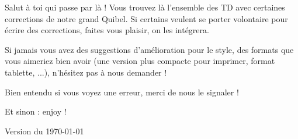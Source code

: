 \documentclass{../commun/prepacours}
\begin{document}
\begin{center}
  \vspace*{2cm}
  
  
  \makeatletter
  \vspace{1.5cm}
  {\Large \@filiere \par}
  \vspace{0.5cm}
  {\large \@etablissement \par}
  \vspace{2cm}
  
  \begin{minipage}{0.8\textwidth}
    \vspace{0.5cm}
    
    Salut à toi qui passe par là ! Vous trouvez là l'ensemble des TD avec certaines corrections de notre grand Quibel. 
    Si certains veulent se porter volontaire pour écrire des corrections, faites 
    vous plaisir, on les intégrera.

    \avspace Si jamais vous avez des suggestions d'amélioration pour le style, 
    des formats que vous aimeriez bien avoir (une version plus compacte pour 
    imprimer, format tablette, ...), n'hésitez pas à nous demander !

    \avspace Bien entendu si vous voyez une erreur, merci de nous le signaler !

    \begin{center}
      Et sinon : enjoy !
    \end{center}
    
    \vspace{0.5cm}
  \end{minipage}
  
  \vfill
  {\Large \@annee \par}
  \vspace{0.5cm}
  {\normalsize Version du \today \par}
  \vspace{1cm}
\end{center}
\makeatother
\clearpage
\end{document}
